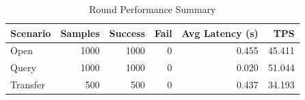 \begin{table}
\caption{Round Performance Summary}
\label{tab:round_perf}
\begin{tabular}{lrrrrr}
\toprule
Scenario & Samples & Success & Fail & Avg Latency (s) & TPS \\
\midrule
Open & 1000 & 1000 & 0 & 0.455 & 45.411 \\
Query & 1000 & 1000 & 0 & 0.020 & 51.044 \\
Transfer & 500 & 500 & 0 & 0.437 & 34.193 \\
\bottomrule
\end{tabular}
\end{table}
